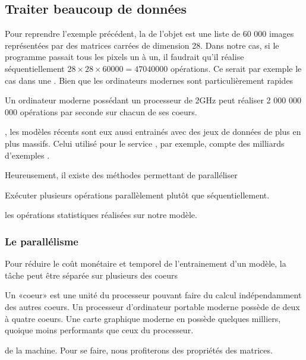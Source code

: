 \documentclass[letterpaper,10pt,french]{sphinxmanual}
\begin{document}
\subsection{Traiter beaucoup de données}
\label{\detokenize{preprocessing:traiter-beaucoup-de-donnees}}
Pour reprendre l’exemple précédent, la  de l’objet est une liste de 60 000 images représentées par des matrices carrées de dimension 28. Dans notre cas, si le programme passait tous les pixels un à un, il faudrait qu’il réalise séquentiellement \(28 \times 28 \times 60 000 = 47 040 000\) opérations. Ce serait par exemple le cas dans une . Bien que les ordinateurs modernes sont particulièrement rapides%
\begin{footnote}[18]\sphinxAtStartFootnote
Un ordinateur moderne possédant un processeur de 2GHz peut réaliser 2 000 000 000 opérations par seconde sur chacun de ses coeurs.
%
\end{footnote}, les modèles récents sont eux aussi entrainés avec des jeux de données de plus en plus massifs. Celui utilisé pour le service , par exemple, compte des milliards d’exemples .

Heureusement, il existe des méthodes permettant de paralléliser%
\begin{footnote}[19]\sphinxAtStartFootnote
Exécuter plusieurs opérations parallèlement plutôt que séquentiellement.
%
\end{footnote} les opérations statistiques réalisées sur notre modèle.


\subsubsection{Le parallélisme}
\label{\detokenize{preprocessing:le-parallelisme}}
Pour réduire le coût monétaire et temporel de l’entrainement d’un modèle, la tâche peut être séparée sur plusieurs des coeurs%
\begin{footnote}[20]\sphinxAtStartFootnote
Un «coeur» est une unité du processeur pouvant faire du calcul indépendamment des autres coeurs. Un processeur d’ordinateur portable moderne possède de deux à quatre coeurs. Une carte graphique moderne en possède quelques milliers, quoique moins performants que ceux du processeur.
%
\end{footnote} de la machine. Pour se faire, nous profiterons des propriétés des matrices.
\end{document}
